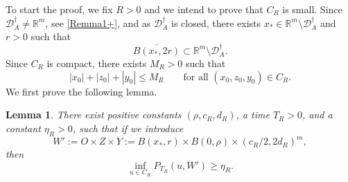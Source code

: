 \documentclass[11pt, a4paper,leqno]{amsart}
\newtheorem{lemma}{Lemma}[section]
\theoremstyle{definition}
\numberwithin{equation}{section}
\newcommand{\R}{\mathbb R}
\begin{document}
To start the proof, we fix $R>0$ and we intend to prove that $C_R$ is small. Since $\mathcal D_A^\dagger\neq\R^m$, see \eqref{Remma1+}, and as  $\mathcal D_A^\dagger$ is closed, there exists $x_\ast\in\R^m\setminus\mathcal D_A^\dagger$ and  $r>0$ such that
\begin{equation}\label{good-ball}
\overline{B(x_\ast,2r)}\subset\R^m\setminus\mathcal D_A^\dagger.
\end{equation}
Since $C_R$ is compact,
there exists $M_R>0$ such that
\begin{equation}\label{Bg1}
|x_0|+|z_0|+|y_0|\le M_R
\qquad
\text{for all }(x_0,z_0,y_0)\in C_R.
\end{equation}
We first prove the following lemma.
\begin{lemma}\label{LemJ1}  There exist positive constants $(\rho,c_R,d_R)$, a time $T_R>0$, and a constant $\eta_R>0$, such that if we introduce
\begin{equation*}
 W':=O\times Z\times Y:=B(x_\ast,r)\times B(0,\rho)\times (c_R/2,2d_R)^m,
\end{equation*}
then
\begin{equation}\label{eqbo2}
\inf_{u\in C_R}
P_{T_R}(u,{W'})\ge\eta_R.
\end{equation}
\end{lemma}
\end{document}
